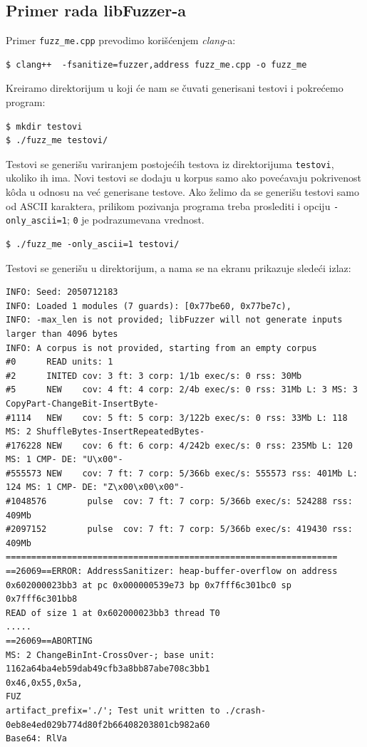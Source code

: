 \subsection{Primer rada libFuzzer-a}\label{primer-rada-libfuzzer-a}

Primer \texttt{fuzz\_me.cpp} prevodimo korišćenjem \emph{clang}-a:

\begin{verbatim}
$ clang++  -fsanitize=fuzzer,address fuzz_me.cpp -o fuzz_me
\end{verbatim}

Kreiramo direktorijum u koji će nam se čuvati generisani testovi i pokrećemo program:

\begin{verbatim}
$ mkdir testovi
$ ./fuzz_me testovi/
\end{verbatim}

Testovi se generišu variranjem postojećih testova iz direktorijuma \texttt{testovi}, ukoliko ih ima. Novi testovi se dodaju u korpus samo ako povećavaju pokrivenost kôda u odnosu na već generisane testove. Ako želimo da se generišu testovi samo od ASCII karaktera, prilikom pozivanja programa treba proslediti i opciju \texttt{-only\_ascii=1}; \texttt{0} je podrazumevana vrednost.

\begin{verbatim}
$ ./fuzz_me -only_ascii=1 testovi/
\end{verbatim}

Testovi se generišu u direktorijum, a nama se na ekranu prikazuje sledeći izlaz:

\begin{verbatim}
INFO: Seed: 2050712183
INFO: Loaded 1 modules (7 guards): [0x77be60, 0x77be7c),
INFO: -max_len is not provided; libFuzzer will not generate inputs larger than 4096 bytes
INFO: A corpus is not provided, starting from an empty corpus
#0      READ units: 1
#2      INITED cov: 3 ft: 3 corp: 1/1b exec/s: 0 rss: 30Mb
#5      NEW    cov: 4 ft: 4 corp: 2/4b exec/s: 0 rss: 31Mb L: 3 MS: 3 CopyPart-ChangeBit-InsertByte-
#1114   NEW    cov: 5 ft: 5 corp: 3/122b exec/s: 0 rss: 33Mb L: 118 MS: 2 ShuffleBytes-InsertRepeatedBytes-
#176228 NEW    cov: 6 ft: 6 corp: 4/242b exec/s: 0 rss: 235Mb L: 120 MS: 1 CMP- DE: "U\x00"-
#555573 NEW    cov: 7 ft: 7 corp: 5/366b exec/s: 555573 rss: 401Mb L: 124 MS: 1 CMP- DE: "Z\x00\x00\x00"-
#1048576        pulse  cov: 7 ft: 7 corp: 5/366b exec/s: 524288 rss: 409Mb
#2097152        pulse  cov: 7 ft: 7 corp: 5/366b exec/s: 419430 rss: 409Mb
=================================================================
==26069==ERROR: AddressSanitizer: heap-buffer-overflow on address 0x602000023bb3 at pc 0x000000539e73 bp 0x7fff6c301bc0 sp 0x7fff6c301bb8
READ of size 1 at 0x602000023bb3 thread T0
.....
==26069==ABORTING
MS: 2 ChangeBinInt-CrossOver-; base unit: 1162a64ba4eb59dab49cfb3a8bb87abe708c3bb1
0x46,0x55,0x5a,
FUZ
artifact_prefix='./'; Test unit written to ./crash-0eb8e4ed029b774d80f2b66408203801cb982a60
Base64: RlVa
\end{verbatim}

